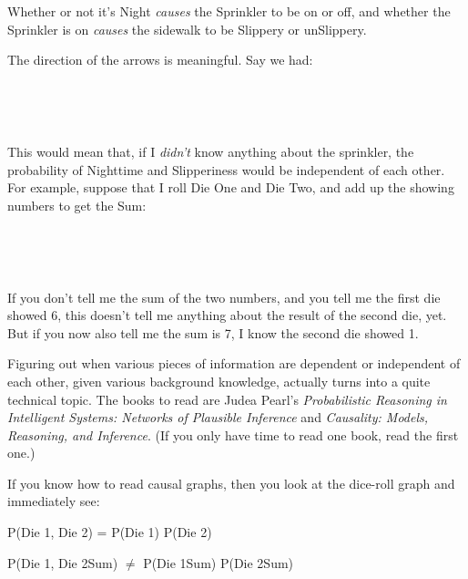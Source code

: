 {
 Whether or not it's Night \textit{causes} the
Sprinkler to be on or off, and whether the Sprinkler is on
\textit{causes} the sidewalk to be Slippery or unSlippery.}

{
 The direction of the arrows is meaningful. Say we had:}

{
 ~}


{
 ~}

{
 This would mean that, if I \textit{didn't} know
anything about the sprinkler, the probability of Nighttime and
Slipperiness would be independent of each other. For example, suppose
that I roll Die One and Die Two, and add up the showing numbers to get
the Sum:}

{
 ~}



{
 ~}

{
 If you don't tell me the sum of the two numbers,
and you tell me the first die showed 6, this doesn't
tell me anything about the result of the second die, yet. But if you
now also tell me the sum is 7, I know the second die showed 1.}

{
 Figuring out when various pieces of information are dependent or
independent of each other, given various background knowledge, actually
turns into a quite technical topic. The books to read are Judea
Pearl's \textit{Probabilistic Reasoning in Intelligent
Systems: Networks of Plausible Inference} and
\textit{Causality: Models, Reasoning, and
Inference}. (If you only have time to read one book,
read the first one.)}

{
 If you know how to read causal graphs, then you look at the
dice-roll graph and immediately see:}

{\centering
 P(Die 1, Die 2) = P(Die 1) {\texttimes} P(Die 2)
\par}


\bigskip

{\centering
 P(Die 1, Die 2{\textbar}Sum) ${\neq}$ P(Die 1{\textbar}Sum)
{\texttimes} P(Die 2{\textbar}Sum)
\par}


\bigskip

